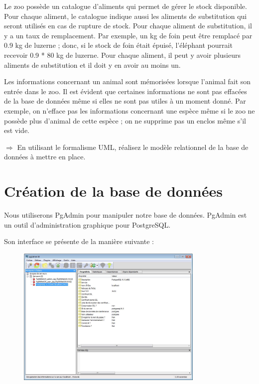 \documentclass[11pt]{article}
\newcommand{\action}{$\Rightarrow$ }
\begin{document}
Le zoo possède un catalogue d'aliments qui permet de gérer le stock disponible. Pour chaque aliment, le catalogue indique aussi les aliments de substitution qui seront utilisés en cas de rupture de stock. Pour chaque aliment de substitution, il y a un taux de remplacement. Par exemple, un kg de foin peut être remplacé par 0.9 kg de luzerne ; donc, si le stock de foin était épuisé, l'éléphant pourrait recevoir 0.9 * 80 kg de luzerne. Pour chaque aliment, il peut y avoir plusieurs aliments de substitution et il doit y en avoir au moins un.

Les informations concernant un animal sont mémorisées lorsque l'animal fait son entrée dans le zoo. Il est évident que certaines informations ne sont pas effacées de la base de données même si elles ne sont pas utiles à un moment donné. Par exemple, on n'efface pas les informations concernant une espèce même si le zoo ne possède plus d'animal de cette espèce ; on ne supprime pas un enclos même s'il est vide.

\action En utilisant le formalisme UML, réalisez le modèle relationnel de la base de données à mettre en place.
		

		
		
\section{Création de la base de données}
Nous utiliserons PgAdmin pour manipuler notre base de données. PgAdmin est un outil d'administration graphique pour PostgreSQL.
		
Son interface se présente de la manière suivante :
\begin{figure}[H]
	\center \includegraphics[width=0.8\textwidth]{img/pgadmin.jpg}\\[1em]
\end{figure}
		
\end{document}
